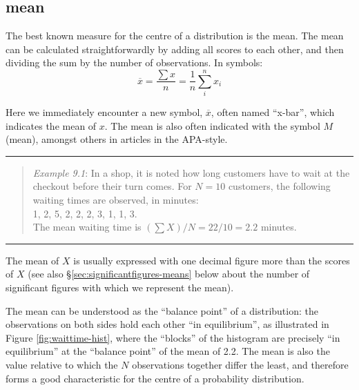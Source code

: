 \documentclass[
]{book}
\begin{document}
\subsection{mean}\label{sec:mean}

The best known measure for the centre of a distribution is the
mean. The mean can be calculated straightforwardly by adding
all scores to each other, and then dividing the sum by the
number of observations. In symbols:
\begin{equation} 
  \overline{x} = \frac{\sum x}{n} = \frac{1}{n} \sum\limits_{i}^n x_i
  \label{eq:average}
\end{equation}

Here we immediately encounter a new symbol, \(\overline{x}\), often
named ``x-bar'', which indicates the mean of \(x\). The mean
is also often indicated with the symbol \(M\) (mean), amongst others
in articles in the APA-style.

\begin{center}\rule{0.5\linewidth}{0.5pt}\end{center}

\begin{quote}
\emph{Example 9.1}: In
a shop, it is noted how long customers have to wait
at the checkout before their turn comes. For \(N=10\) customers,
the following waiting times are observed, in minutes:\\
1, 2, 5, 2, 2, 2, 3, 1, 1, 3.\\
The mean waiting time is \((\sum X)/N = 22/10 = 2.2\) minutes.
\end{quote}

\begin{center}\rule{0.5\linewidth}{0.5pt}\end{center}

The mean of \(X\) is usually expressed with one decimal figure more than
the scores of \(X\) (see also §\ref{sec:significantfigures-means} below about the number of significant
figures with which we represent the mean).

The mean can be understood as the ``balance point'' of a distribution:
the observations on both sides hold each other ``in equilibrium'', as
illustrated in Figure \ref{fig:waittime-hist}, where the ``blocks''
of the histogram are precisely ``in equilibrium'' at the ``balance point''
of the mean of 2.2. The mean is also the value relative to which the
\(N\) observations together differ the least, and therefore forms a good
characteristic for the centre of a probability distribution.
\end{document}
